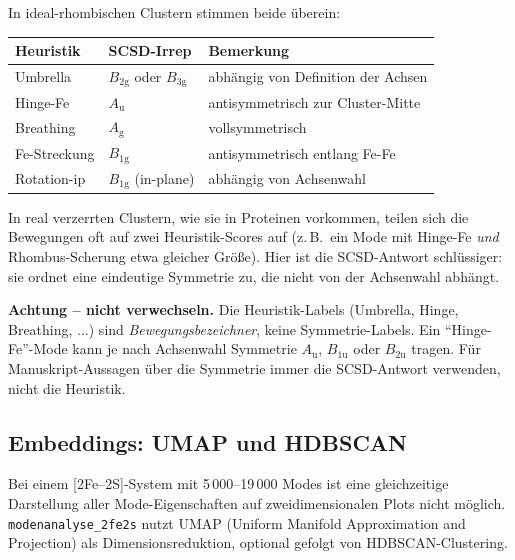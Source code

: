 \documentclass[11pt,a4paper,twoside]{article}
\newcommand{\Ag}{A_{\mathrm{g}}}
\newcommand{\Bgi}[1]{B_{\mathrm{#1g}}}
\newcommand{\Bui}[1]{B_{\mathrm{#1u}}}
\newcommand{\Aui}{A_{\mathrm{u}}}
\theoremstyle{remark}
\begin{document}
In ideal-rhombischen Clustern stimmen beide \"uberein:

\begin{center}
\begin{tabularx}{\textwidth}{l l X}
\toprule
\textbf{Heuristik} & \textbf{SCSD-Irrep} & \textbf{Bemerkung} \\
\midrule
Umbrella     & $\Bgi{2}$ oder $\Bgi{3}$ & abh\"angig von Definition der Achsen \\
Hinge-Fe     & $\Aui$           & antisymmetrisch zur Cluster-Mitte \\
Breathing    & $\Ag$            & vollsymmetrisch \\
Fe-Streckung & $\Bgi{1}$        & antisymmetrisch entlang Fe-Fe \\
Rotation-ip  & $\Bgi{1}$ (in-plane) & abh\"angig von Achsenwahl \\
\bottomrule
\end{tabularx}
\end{center}

In real verzerrten Clustern, wie sie in Proteinen vorkommen, teilen
sich die Bewegungen oft auf zwei Heuristik-Scores auf
(z.\,B.\ ein Mode mit Hinge-Fe \emph{und} Rhombus-Scherung etwa
gleicher Gr\"o\ss e). Hier ist die SCSD-Antwort schl\"ussiger: sie
ordnet eine eindeutige Symmetrie zu, die nicht von der Achsenwahl
abh\"angt.

\begin{warnbox}
\textbf{Achtung -- nicht verwechseln.} Die Heuristik-Labels (Umbrella,
Hinge, Breathing, ...) sind \emph{Bewegungsbezeichner}, keine
Symmetrie-Labels. Ein "`Hinge-Fe"'-Mode kann je nach Achsenwahl
Symmetrie $\Aui$, $\Bui{1}$ oder $\Bui{2}$ tragen. F\"ur
Manuskript-Aussagen \"uber die Symmetrie immer die SCSD-Antwort
verwenden, nicht die Heuristik.
\end{warnbox}

\subsection{Embeddings: UMAP und HDBSCAN}
\label{sec:embeddings}

Bei einem [2Fe--2S]-System mit 5\,000--19\,000 Modes ist eine
gleichzeitige Darstellung aller Mode-Eigenschaften auf
zweidimensionalen Plots nicht m\"oglich. \texttt{modenanalyse\_2fe2s}
nutzt UMAP (Uniform Manifold Approximation and Projection) als
Dimensionsreduktion, optional gefolgt von HDBSCAN-Clustering.
\end{document}
